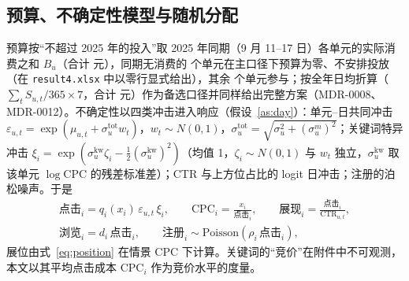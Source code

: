 \subsection{预算、不确定性模型与随机分配}
\label{sec:q4alloc}
预算按“不超过 2025 年的投入”取 2025 年同期（9 月 11--17 日）各单元的实际消费之和 $B_u$（合计 \valQfourBudget{} 元），同期无消费的 \valQfourSkippedUnits{} 个单元在主口径下预算为零、不安排投放（在 \texttt{result4.xlsx} 中以零行显式给出），其余 \valQfourUnits{} 个单元参与；按全年日均折算（$\sum_tS_{u,t}/365\times7$，合计 \valQfourBudgetAnnualAlt{} 元）作为备选口径并同样给出完整方案（MDR-0008、MDR-0012）。不确定性以四类冲击进入响应（假设~\ref{as:day}）：单元--日共同冲击 $\varepsilon_{u,t}=\exp(\mu_{u,t}+\sigma_{u}^{\mathrm{tot}}w_t)$，$w_t\sim N(0,1)$，$\sigma_{u}^{\mathrm{tot}}=\sqrt{\sigma_u^2+(\sigma^{m}_u)^2}$；关键词特异冲击 $\xi_i=\exp(\sigma^{\mathrm{kw}}_u\zeta_i-\tfrac12(\sigma^{\mathrm{kw}}_u)^2)$（均值 1，$\zeta_i\sim N(0,1)$ 与 $w_t$ 独立，$\sigma^{\mathrm{kw}}_u$ 取该单元 $\log\mathrm{CPC}$ 的残差标准差）；CTR 与上方位占比的 logit 日冲击；注册的泊松噪声。于是
\begin{equation}\label{eq:stoch}
\begin{gathered}
\text{点击}_i=q_i(x_i)\,\varepsilon_{u,t}\,\xi_i,\qquad
\mathrm{CPC}_i=\frac{x_i}{\text{点击}_i},\qquad
\text{展现}_i=\frac{\text{点击}_i}{\mathrm{CTR}_{u,t}},\\
\text{浏览}_i=d_i\,\text{点击}_i,\qquad
\text{注册}_i\sim\mathrm{Poisson}(\rho_i\,\text{点击}_i),
\end{gathered}
\end{equation}
展位由式~\eqref{eq:position} 在情景 CPC 下计算。关键词的“竞价”在附件中不可观测，本文以其平均点击成本 $\mathrm{CPC}_i$ 作为竞价水平的度量。

